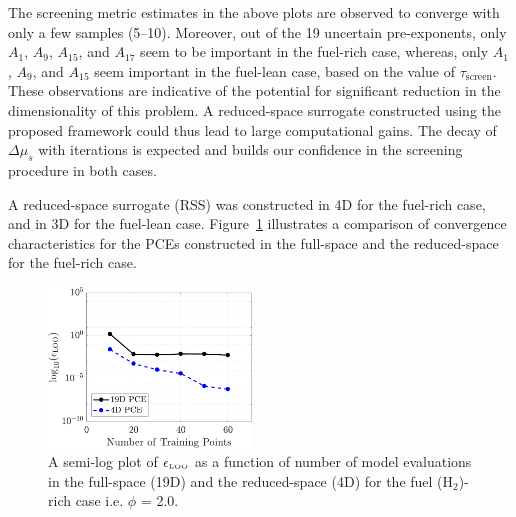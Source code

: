 %
The screening metric estimates in the above plots are observed to converge with
only a few samples (5--10). Moreover, out of the 19 uncertain pre-exponents,
only $A_1$, $A_9$, $A_{15}$, and $A_{17}$ seem to be important in the fuel-rich
case, whereas, only $A_1$, $A_9$, and $A_{15}$ seem important in the fuel-lean
case, based on the value of $\tau_\text{screen}$. These observations are indicative
of the potential for significant reduction in the dimensionality of this problem. 
A reduced-space
surrogate constructed using the proposed framework could thus lead to large computational
gains. The decay of $\Delta\mu_s$ with iterations is expected and builds our confidence
in the screening procedure in both cases.

A reduced-space surrogate (RSS) was constructed in 4D for the fuel-rich case,
and in 3D for
the fuel-lean case. Figure~\ref{fig:err_samples_kinetics} illustrates a
comparison of convergence characteristics for the PCEs constructed in the
full-space and the reduced-space for the fuel-rich case.
%
\begin{figure}[htbp]
 \begin{center}
  \includegraphics[width=0.48\textwidth]{./Figures/err_samples_kinetics}
\caption{A semi-log plot of $\epsilon_\text{\tiny LOO}$ as a function of
number of model evaluations in the full-space (19D) and the reduced-space (4D)
for the fuel (H$_2$)-rich case i.e. $\phi$ = 2.0.}
\label{fig:err_samples_kinetics}
\end{center}
\end{figure}
%



